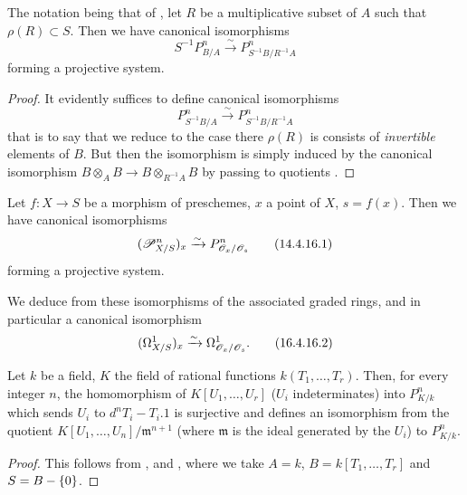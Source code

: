 \begin{corollary}[16.4.15]
\label{IV.16.4.15}
The notation being that of , let $R$ be a multiplicative subset of $A$ such that $\rho(R) \subset S$.
Then we have canonical isomorphisms 
\[
  \label{IV.16.4.15.1}
  S^{-1}P_{B/A}^n \xrightarrow{\sim} P_{S^{-1}B/R^{-1}A}^n
  \tag{16.4.15.1}
\]
forming a projective system.
\end{corollary}

\begin{proof}
It evidently suffices to define canonical isomorphisms 
\[
  \label{IV.16.4.15.2}
  P_{S^{-1}B/A}^n \xrightarrow{\sim} P_{S^{-1}B/R^{-1}A}^n
  \tag{16.4.15.2}
\]
that is to say that we reduce to the case there $\rho(R)$ is consists of \emph{invertible} elements of $B$.
But then the isomorphism  is simply induced by the canonical isomorphism $B \otimes_A B \to B \otimes_{R^{-1}A} B$ by passing to quotients .
\end{proof}

\begin{corollary}[16.4.16]
\label{IV.16.4.16}
Let $f:X \to S$ be a morphism of preschemes, $x$ a point of $X$, $s = f(x)$.
Then we have canonical isomorphisms
\[
  \label{IV.14.4.16.1}
  (\mathscr{P}_{X/S}^n)_x \xrightarrow{\sim} P_{\mathscr{O}_x/\mathscr{O}_s}^n
  \tag{14.4.16.1}
\]
forming a projective system.
\end{corollary}

We deduce from these isomorphisms of the associated graded rings, and in particular a canonical isomorphism
\[
  \label{IV.16.4.16.2}
  (\Omega_{X/S}^1)_x \xrightarrow{\sim} \Omega_{\mathscr{O}_x/\mathscr{O}_s}^1.
  \tag{16.4.16.2}
\]

\begin{corollary}[16.4.17]
\label{IV.16.4.17}
Let $k$ be a field, $K$ the field of rational functions $k(T_1, \dots, T_r)$.
Then, for every integer $n$, the homomorphism of $K[U_1, \dots, U_r]$ ($U_i$ indeterminates) into $P_{K/k}^n$ which sends $U_i$ to $d^nT_i - T_i.1$ is surjective and defines an isomorphism from the quotient $K[U_1, \dots, U_n]/\mathfrak{m}^{n+1}$  (where $\mathfrak{m}$ is the ideal generated by the $U_i$) to $P_{K/k}^n$.
\end{corollary}

\begin{proof}
This follows from ,   and , where we take $A = k$, $B = k[T_1, \dots, T_r]$ and $S = B - \{0\}$.
\end{proof}

